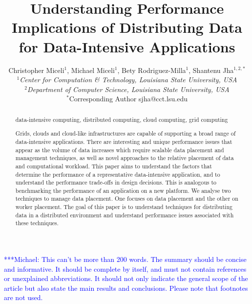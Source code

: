 \documentclass{rspublic}
\title[Understanding Performance Implications of Distributing Data for
Data-Intensive Applications]{Understanding Performance Implications of
Distributing Data for Data-Intensive Applications}
\author[Miceli, Miceli, Rodriguez-Milla, Jha]{ Christopher Miceli$^{1}$,
Michael Miceli$^{1}$, Bety Rodriguez-Milla$^{1}$, Shantenu Jha$^{1,2,*}$ \\
\small{\emph{$^{1}$Center for Computation \& Technology, Louisiana State
University, USA}} \\  \small{\emph{$^{2}$Department of Computer Science,
Louisiana State University, USA}} \\ {\footnotesize {\hspace{0.0 in}
$^*$Corresponding Author sjha@cct.lsu.edu}} }
\newcommand{\micnote}[1]{ {\textcolor{blue} { ***Michael: #1 }}}
\begin{document}
 \maketitle

\micnote{This can't be more than 200 words. The summary should be
concise and informative. It should be complete by itself, and must not
contain references or unexplained abbreviations. It should not only
indicate the general scope of the article but also state the main
results and conclusions. Please note that footnotes are not used.}

\begin{abstract}{data-intensive computing, distributed computing,
    cloud computing, grid computing} 

  Grids, clouds and cloud-like infrastructures are capable of
  supporting a broad range of data-intensive applications. There are
  interesting and unique performance issues that appear as the volume
  of data increases which require scalable data placement and
  management techniques, as well as novel approaches to the relative
  placement of data and computational workload.  This paper aims to
  understand the factors that determine the performance of a
  representative data-intensive application, and to understand the
  performance trade-offs in design decisions. This is analogous to
  benchmarking the performance of an application on a new platform. We
  analyse two techniques to manage data placement. One focuses on data
  placement and the other on worker placement. The goal of this paper
  is to understand techniques for distributing data in a distributed
  environment and understand performance issues associated with these
  techniques.

\end{abstract}

\end{document}
